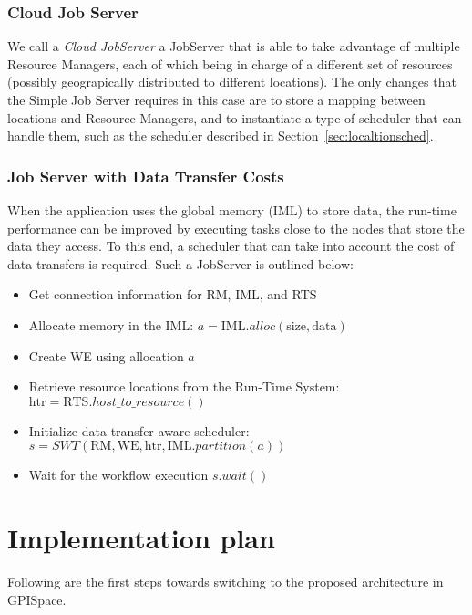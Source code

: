\documentclass[10pt]{article}
\newcommand{\rts}{RTS\xspace}
\newcommand{\rman}{RM\xspace}
\newcommand{\iml}{IML\xspace}
\newcommand{\we}{WE\xspace}
\begin{document}
\subsubsection{Cloud Job Server}
We call a \emph{Cloud JobServer} a JobServer that is able to take advantage of
multiple Resource Managers, each of which being in charge of a different set of
resources (possibly geograpically distributed to different locations).
The only changes that the Simple Job Server requires in this case are to store a
mapping between locations and Resource Managers, and to instantiate a type of
scheduler that can handle them, such as the scheduler described in
Section~\ref{sec:localtionsched}.

\subsubsection{Job Server with Data Transfer Costs}
When the application uses the global memory (\iml) to store data, the run-time
performance can be improved by executing tasks close to the nodes that store the
data they access. To this end, a scheduler that can take into account the cost
of data transfers is required.
Such a JobServer is outlined below:
\begin{itemize}
    \item Get connection information for \rman, \iml, and \rts
    \item Allocate memory in the \iml: $a = \text{\iml}.alloc(\text{size}, \text{data})$
    \item Create \we using allocation $a$
    \item Retrieve resource locations from the Run-Time System: $\text{htr} = \text{\rts}.host\_to\_resource()$
    \item Initialize data transfer-aware scheduler: $s = SWT(\text{\rman}, \text{\we}, \text{htr}, \text{\iml}.partition(a))$
    \item Wait for the workflow execution $s.wait()$
\end{itemize}


\section{Implementation plan}

Following are the first steps towards switching to the proposed architecture in
GPISpace.
\end{document}
